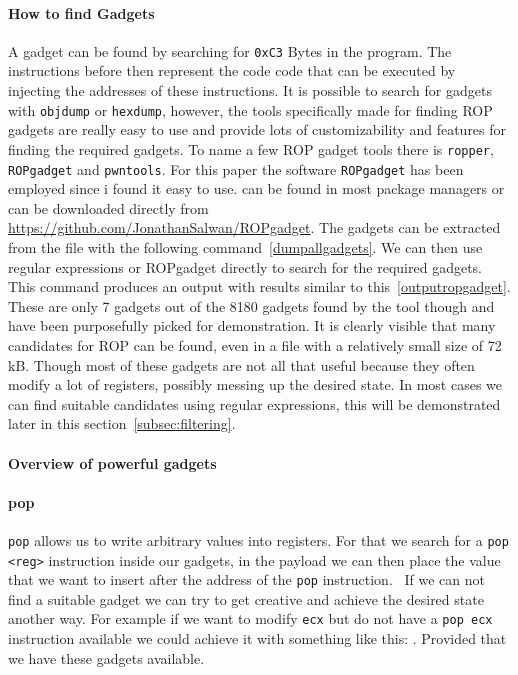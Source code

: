 \documentclass[journal=tosc,submission, notanonymous]{iacrtrans}
\begin{document}
\paragraph{How to find Gadgets}
\label{par:ropgadget}
A gadget can be found by searching for \Verb+0xC3+ Bytes in the program. The instructions before then represent the code code that can be executed by injecting the addresses of these instructions. It is possible to search for gadgets with \Verb+objdump+ or \Verb+hexdump+, however, the tools specifically made for finding ROP gadgets are really easy to use and provide lots of customizability and features for finding the required gadgets. To name a few ROP gadget tools there is \Verb+ropper+, \Verb+ROPgadget+ and \Verb+pwntools+. For this paper the software \Verb+ROPgadget+ has been employed since i found it easy to use.  can be found in most package managers or can be downloaded directly from \url{https://github.com/JonathanSalwan/ROPgadget}. The gadgets can be extracted from the file with the following command~\cref{dumpallgadgets}. We can then use regular expressions or ROPgadget directly to search for the required gadgets.
This command produces an output with results similar to this~\cref{outputropgadget}.
These are only 7 gadgets out of the 8180 gadgets found by the tool though and have been purposefully picked for demonstration. It is clearly visible that many candidates for ROP can be found, even in a file with a relatively small size of 72 kB. Though most of these gadgets are not all that useful because they often modify a lot of registers, possibly messing up the desired state. In most cases we can find suitable candidates using regular expressions, this will be demonstrated later in this section~\cref{subsec:filtering}.
\paragraph{Overview of powerful gadgets}
\paragraph{pop}
\Verb+pop+ allows us to write arbitrary values into registers. For that we search for a \Verb+pop <reg>+ instruction inside our gadgets, in the payload we can then place the value that we want to insert after the address of the \Verb+pop+ instruction.~\cite{ropsla} If we can not find a suitable gadget we can try to get creative and achieve the desired state another way. For example if we want to modify \Verb+ecx+ but do not have a \Verb+pop ecx+ instruction available we could achieve it with something like this: . Provided that we have these gadgets available.
\end{document}
